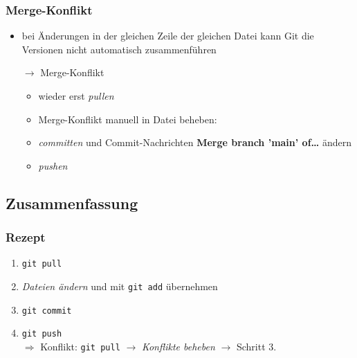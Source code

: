 \documentclass[accentcolor=tud8b,colorbacktitle,inverttitle,landscape,german,presentation,t]{tudbeamer}
\begin{document}
			\begin{frame}
				\frametitle{Merge-Konflikt}
					\begin{itemize}
						\item bei Änderungen in der gleichen Zeile der gleichen Datei kann Git die Versionen nicht automatisch zusammenführen
						\item[$\rightarrow$] Merge-Konflikt
						\begin{itemize}
							\item wieder erst \textit{pullen}
							\item Merge-Konflikt manuell in Datei beheben:\\
							
							\item \textit{committen} und Commit-Nachrichten \textbf{Merge branch 'main' of\dots} ändern
							\item \textit{pushen}
						\end{itemize}
					\end{itemize}
				
			\end{frame}
			
		
	\subsection{Zusammenfassung}
		\begin{frame}
		\frametitle{Rezept}
			\begin{enumerate}
				\item \texttt{git pull}
				\item \textit{Dateien ändern} und mit \texttt{git add} übernehmen
				\item \texttt{git commit}
				\item \texttt{git push}\\
				$\Rightarrow$ Konflikt: \texttt{git pull} $\rightarrow$ \textit{Konflikte beheben} $\rightarrow$ Schritt 3.
				
			\end{enumerate}
		\end{frame}
	
\end{document}
